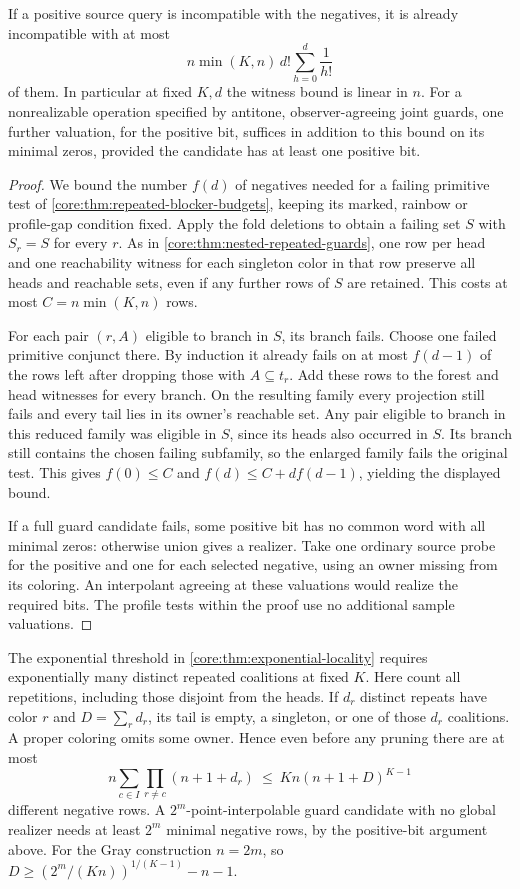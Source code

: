 \begin{corollary}
\label{core:cor:repetition-locality}
If a positive source query is incompatible with the negatives, it is
already incompatible with at most
\[
 n\min(K,n)\,d!\sum_{h=0}^d\frac1{h!}
\]
of them. In particular at fixed $K,d$ the witness bound is linear in $n$.
For a nonrealizable operation specified by antitone, observer-agreeing
joint guards, one further
valuation, for the positive bit, suffices in addition to this bound on
its minimal zeros, provided the candidate has at least one positive bit.
\end{corollary}
\begin{proof}
We bound the number $f(d)$ of negatives needed for a failing primitive
test of \cref{core:thm:repeated-blocker-budgets}, keeping its marked,
rainbow or profile-gap condition fixed. Apply the fold deletions to
obtain a failing set $S$ with $S_r=S$ for every $r$. As in
\cref{core:thm:nested-repeated-guards}, one row per head and one
reachability witness for each singleton color in that row preserve
all heads and reachable sets, even if any further rows of $S$ are
retained. This costs at most $C=n\min(K,n)$ rows.

For each pair $(r,A)$ eligible to branch in $S$, its branch fails. Choose one
failed primitive conjunct there. By induction it already fails on at
most $f(d-1)$ of the rows left after dropping those with $A\subseteq t_r$.
Add these rows to the forest and head witnesses for every branch.
On the resulting family every projection still fails and every tail
lies in its owner's reachable set. Any pair eligible to branch in this reduced family was eligible in $S$,
since its heads also occurred in $S$. Its branch still contains the chosen failing subfamily,
so the enlarged family fails the original test. This gives
$f(0)\le C$ and $f(d)\le C+d f(d-1)$, yielding the displayed bound.

If a full guard candidate fails, some positive bit has no common word
with all minimal zeros: otherwise union gives a realizer.
Take one ordinary source probe for the positive and one for each
selected negative, using an owner missing from its coloring.
An interpolant agreeing at these valuations would realize the required
bits. The profile tests within the proof use no additional sample valuations.
\end{proof}

The exponential threshold in \cref{core:thm:exponential-locality}
requires exponentially many distinct repeated coalitions at fixed $K$.
Here count all repetitions, including those disjoint from the heads. If
$d_r$ distinct repeats have color $r$ and $D=\sum_r d_r$, its tail is empty,
a singleton, or one of those $d_r$ coalitions. A proper coloring omits
some owner. Hence even before any pruning there are at most
\[
 n\sum_{c\in I}\prod_{r\ne c}(n+1+d_r)
 \ \le\ Kn(n+1+D)^{K-1}
\]
different negative rows. A $2^m$-point-interpolable guard candidate
with no global realizer needs at least $2^m$ minimal negative rows,
by the positive-bit argument above. For the Gray construction
$n=2m$, so $D\ge (2^m/(Kn))^{1/(K-1)}-n-1$.


